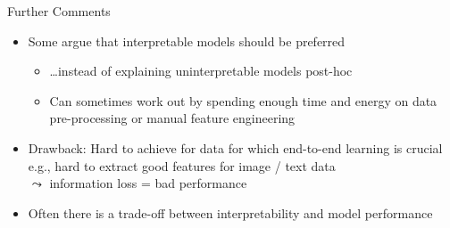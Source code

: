 \documentclass[11pt,compress,t,notes=noshow, aspectratio=169, xcolor=table]{beamer}
\begin{document}
\begin{frame}{Further Comments}

    \begin{itemize}
        \item<1-> Some argue that interpretable models should be preferred 
        \begin{itemize}
            \item \ldots instead of explaining uninterpretable models post-hoc
            \item Can sometimes work out by spending enough time and energy on data pre-processing or manual feature engineering
        \end{itemize}
       \item<2->[$\leadsto$] Drawback: Hard to achieve for data for which end-to-end learning is crucial\\ 
       e.g., hard to extract good features for image / text data\\ $\leadsto$ information loss = bad performance
        \item<3-> Often there is a trade-off between interpretability and model performance 
    \end{itemize}
    
    \smallskip
    

\end{frame}
\end{document}
